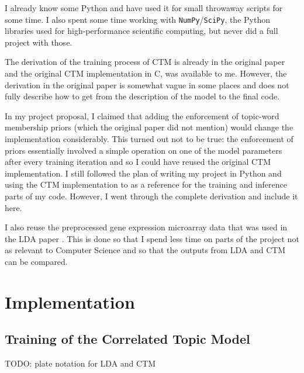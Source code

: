 \documentclass[12pt,a4paper,twoside,openright]{report}
\begin{document}
I already know some Python and have used it for small throwaway scripts for some time. I also spent some time working with \texttt{NumPy}/\texttt{SciPy}, the Python libraries used for high-performance scientific computing, but never did a full project with those.

The derivation of the training process of CTM is already in the original paper \cite{Blei} and the original CTM implementation in C, was available to me. However, the derivation in the original paper is somewhat vague in some places and does not fully describe how to get from the description of the model to the final code.

In my project proposal, I claimed that adding the enforcement of topic-word membership priors (which the original paper did not mention) would change the implementation considerably. This turned out not to be true: the enforcement  of priors essentially involved a simple operation on one of the model parameters after every training iteration and so I could have reused the original CTM implementation. I still followed the plan of writing my project in Python and using the CTM implementation to as a reference for the training and inference parts of my code. However, I went through the complete derivation and include it here.

I also reuse the preprocessed gene expression microarray data that was used in the LDA paper \cite{Pratanwanich2014}. This is done so that I spend less time on parts of the project not as relevant to Computer Science and so that the outputs from LDA and CTM can be compared.

\chapter{Implementation}

\section{Training of the Correlated Topic Model}

TODO: plate notation for LDA and CTM

\end{document}
